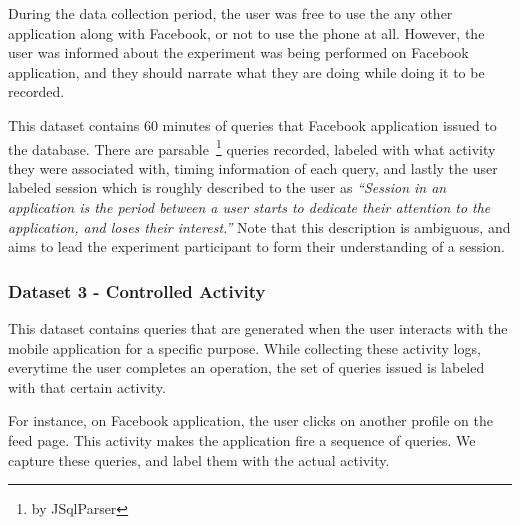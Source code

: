 During the data collection period, the user was free to use the any other application along with Facebook, or not to use the phone at all. However, the user was informed about the experiment was being performed on Facebook application, and they should narrate what they are doing while doing it to be recorded. 

This dataset contains 60 minutes of queries that Facebook application issued to the database. There are  parsable~\footnote{by JSqlParser} queries recorded, labeled with what activity they were associated with, timing information of each query, and lastly the user labeled session which is roughly described to the user as \textit{``Session in an application is the period between a user starts to dedicate their attention to the application, and loses their interest.''} Note that this description is ambiguous, and aims to lead the experiment participant to form their understanding of a session.

\subsubsection{Dataset 3 - Controlled Activity}
\label{sec:controlledactivity}

This dataset contains queries that are generated when the user interacts with the mobile application for a specific purpose. While collecting these activity logs, everytime the user completes an operation, the set of queries issued is labeled with that certain activity.

For instance, on Facebook application, the user clicks on another profile on the feed page. This activity makes the application fire a sequence of queries. We capture these queries, and label them with the actual activity.



